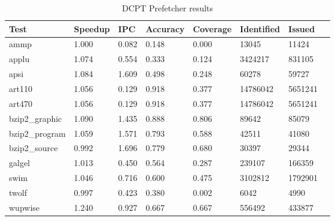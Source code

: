 \begin{table}[!t]
\renewcommand{\arraystretch}{1.3}
\caption{DCPT Prefetcher results}
\label{table:results3}
\centering
\begin{tabular}{|l|l|l|l|l|l|l|l|}
\hline
\bfseries Test & \bfseries Speedup & \bfseries IPC & \bfseries Accuracy & \bfseries Coverage & \bfseries Identified & \bfseries Issued\\
\hline
\hline
ammp 		& 1.000 & 	0.082 &	0.148 &	0.000 &	13045 &	11424\\
applu 		& 1.074 & 	0.554 &	0.333 &	0.124 &	3424217 & 	831105\\
apsi 		& 1.084 & 	1.609 &	0.498 &	0.248 &	60278 &	59727\\	
art110 		& 1.056 & 	0.129 &	0.918 &	0.377 &	14786042 &	5651241\\	
art470 		& 1.056 & 	0.129 &	0.918 &	0.377 &	14786042 &	5651241\\
bzip2\_graphic 	& 1.090 & 	1.435 &	0.888 &	0.806 &	89642 &	85079 	\\
bzip2\_program 	& 1.059 & 	1.571 &	0.793 &	0.588 &	42511 &	41080 	\\
bzip2\_source 	& 0.992 & 	1.696 &	0.779 &	0.680 &	30397 &	29344\\
galgel 		& 1.013 & 	0.450 &	0.564 &	0.287 &	239107 &	 166359\\
swim 		& 1.046 & 	0.716 &	0.600 &	0.475 &	3102812 & 	1792901\\
twolf 		& 0.997 & 	0.423 &	0.380 &	0.002 &	6042 &	4990 		\\
wupwise 	& 1.240 & 	0.927 &	0.667 &	0.667 &	556492 & 	433877 	\\
\hline
\end{tabular}
\end{table}




